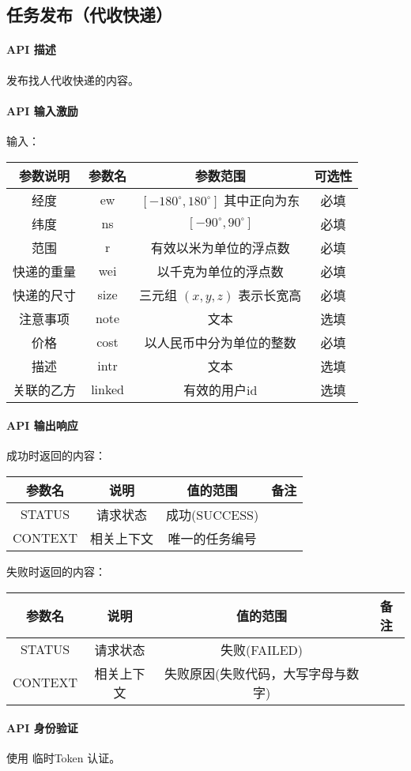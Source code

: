 \documentclass[UTF8]{dingo}
\def\apiintr{\paragraph{\colorbox[rgb]{1.0,0.6,0.65}{API 描述}}} %
\def\apiexc{\paragraph{\colorbox[rgb]{1,0.85,0.45}{API 输入激励}}} %
\def\apiresp{\paragraph{\colorbox[rgb]{0.9,0.9,1}{API 输出响应}}} %
\def\apiauth{\paragraph{\colorbox[rgb]{0.45,0.9,1}{API 身份验证}}} %
\def\失败{\colorbox[rgb]{1,0.5,0.5}{失败}}
\def\成功{\colorbox[rgb]{0.4,1,0.5}{成功}}
\def\成功V{成功(SUCCESS)}
\def\失败V{失败(FAILED)}
\def\失败原因{失败原因(失败代码，大写字母与数字)}
\begin{document}
    \subsection{任务发布（代收快递）}
    \apiintr
    发布找人代收快递的内容。
    \apiexc
    输入：\\
    \begin{tabular}{|c|c|c|c|}
        \hline \rule[-2ex]{0pt}{5.5ex} 参数说明 & 参数名 & 参数范围 & 可选性 \\
        \hline \rule[-2ex]{0pt}{5.5ex} 经度 & ew & $[-180^\circ,180^\circ]$ 其中正向为东 & 必填 \\
        \hline \rule[-2ex]{0pt}{5.5ex} 纬度 & ns & $[-90^\circ,90^\circ]$ & 必填 \\
        \hline \rule[-2ex]{0pt}{5.5ex} 范围 & r & 有效以米为单位的浮点数 & 必填 \\
        \hline \rule[-2ex]{0pt}{5.5ex} 快递的重量 & wei & 以千克为单位的浮点数 & 必填 \\
        \hline \rule[-2ex]{0pt}{5.5ex} 快递的尺寸 & size & 三元组 $(x,y,z)$ 表示长宽高 & 必填 \\
        \hline \rule[-2ex]{0pt}{5.5ex} 注意事项 & note & 文本 & 选填 \\
        \hline \rule[-2ex]{0pt}{5.5ex} 价格 & cost & 以人民币中分为单位的整数 & 必填 \\
        \hline \rule[-2ex]{0pt}{5.5ex} 描述 & intr & 文本 & 选填 \\
        \hline \rule[-2ex]{0pt}{5.5ex} 关联的乙方 & linked & 有效的用户id & 选填 \\
        \hline
    \end{tabular}
    \apiresp
    \成功 时返回的内容：\\
    \begin{tabular}{|c|c|c|c|}
        \hline \rule[-2ex]{0pt}{5.5ex} 参数名 & 说明 & 值的范围 & 备注 \\
        \hline \rule[-2ex]{0pt}{5.5ex} STATUS & 请求状态 & \成功V &  \\
        \hline \rule[-2ex]{0pt}{5.5ex} CONTEXT & 相关上下文 & 唯一的任务编号 &  \\
        \hline
    \end{tabular}
    \par \失败 时返回的内容：\\
    \begin{tabular}{|c|c|c|c|}
        \hline \rule[-2ex]{0pt}{5.5ex} 参数名 & 说明 & 值的范围 & 备注 \\
        \hline \rule[-2ex]{0pt}{5.5ex} STATUS & 请求状态 & \失败V &  \\
        \hline \rule[-2ex]{0pt}{5.5ex} CONTEXT & 相关上下文 & \失败原因 &  \\
        \hline
    \end{tabular}
    \apiauth
    使用 临时Token 认证。
\end{document}
